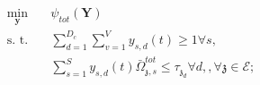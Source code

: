\documentclass[conference]{IEEEtran}
\begin{document}
\begin{enumerate}
\begin{subequations}
\begin{alignat}{4}
\min\limits_{\boldsymbol{y} }   \quad &   \psi_{tot}(\boldsymbol{Y})\\
\text{s. t.} \quad & \textstyle \sum_{d=1}^{D_c}\sum_{v=1}^{V}y_{s,d}(t) \geq 1 \forall s, \\
 &\textstyle  \sum_{s=1}^{S} y_{s,d}(t) \bar{\Omega}_{\mathfrak{z},s}^{tot}  \leq   \tau_{\mathfrak{z}_d}  \forall d,, \forall \mathfrak{z}\in \mathcal{E};  \label{eqomega}
\end{alignat}
\end{subequations}
\end{enumerate}



\end{document}
